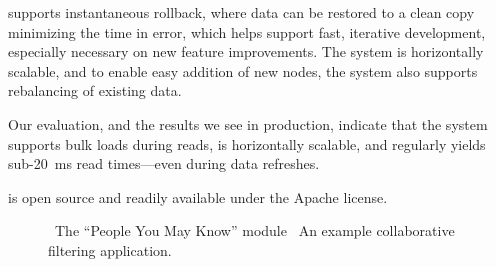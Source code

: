 \projectname{} supports instantaneous rollback, where data can be
restored to a clean copy minimizing the time in error, which helps
support fast, iterative development, especially necessary on new
feature improvements. The system is horizontally scalable, and to
enable easy addition of new nodes, the system also supports
rebalancing of existing data.

Our evaluation, and the results we see in production, indicate that
the system supports bulk loads during reads, is horizontally scalable,
and regularly yields sub-20~ms read times---even during data
refreshes.

\projectname{} is open source and readily available under the Apache
license. 

\begin{figure}
\centering
{}


\caption{~The ``People You May Know'' module
~An example collaborative filtering
application.}
\end{figure}

